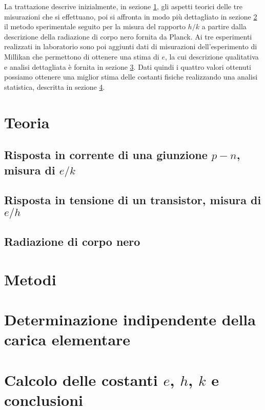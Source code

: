 \documentclass[a4paper, nofootinbib]{revtex4-2}
\begin{document}
La trattazione descrive inizialmente, in sezione \ref{sec:theory}, gli aspetti teorici delle tre misurazioni che si effettuano, poi si affronta in modo più dettagliato in sezione \ref{sec:black_body_methods} il metodo sperimentale seguito per la misura del rapporto $h/k$ a partire dalla descrizione della radiazione di corpo nero fornita da Planck. Ai tre esperimenti realizzati in laboratorio sono poi aggiunti dati di misurazioni dell'esperimento di Millikan che permettono di ottenere una stima di $e$, la cui descrizione qualitativa e analisi dettagliata è fornita in sezione \ref{sec:millikan}. Dati quindi i quattro valori ottenuti possiamo ottenere una miglior stima delle costanti fisiche realizzando una analisi statistica, descritta in sezione \ref{sec:combined_data}. 

\section{Teoria}\label{sec:theory}

\subsection{Risposta in corrente di una giunzione $p-n$, misura di $e/k$}

\subsection{Risposta in tensione di un transistor, misura di $e/h$}

\subsection{Radiazione di corpo nero}

\section{Metodi}\label{sec:black_body_methods}

\section{Determinazione indipendente della carica elementare}\label{sec:millikan}

\section{Calcolo delle costanti $e$, $h$, $k$ e conclusioni}\label{sec:combined_data}


\end{document}
